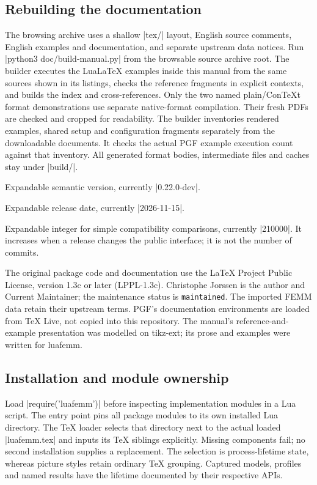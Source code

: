 \subsection{Rebuilding the documentation}
The browsing archive uses a shallow |tex/| layout, English source comments,
English examples and documentation, and separate upstream data notices.
Run |python3 doc/build-manual.py| from the browsable source
archive root. The builder executes the LuaLaTeX examples inside this manual
from the same sources shown in its listings, checks the reference fragments
in explicit contexts, and builds the index and cross-references. Only the
two named plain/ConTeXt format demonstrations use separate native-format
compilation. Their fresh PDFs are checked and cropped for readability.
The builder inventories rendered examples, shared setup and configuration
fragments separately from the downloadable documents. It checks the actual
PGF example execution count against that inventory. All generated format
bodies, intermediate files and caches stay under |build/|.

\begin{command}{\luafemmversion}
Expandable semantic version, currently |0.22.0-dev|.
\end{command}
\begin{command}{\luafemmversiondate}
Expandable release date, currently |2026-11-15|.
\end{command}
\begin{command}{\luafemmversionnumber}
Expandable integer for simple compatibility comparisons, currently |210000|.
It increases when a release changes the public interface; it is not the
number of commits.
\end{command}

The original package code and documentation use the LaTeX Project Public
License, version 1.3c or later (LPPL-1.3c). Christophe Jorssen is the author and
Current Maintainer; the maintenance status is \texttt{maintained}. The
imported FEMM data retain their upstream terms. PGF's documentation
environments are loaded from TeX Live, not copied into this repository.
The manual's reference-and-example presentation was modelled on tikz-ext;
its prose and examples were written for luafemm.

\subsection{Installation and module ownership}
Load |require('luafemm')| before inspecting implementation modules in a Lua
script. The entry point pins all package modules to its own installed Lua
directory. The TeX loader selects that directory next to the actual loaded
|luafemm.tex| and inputs its TeX siblings explicitly. Missing components fail;
no second installation supplies a replacement. The selection is process-lifetime
state, whereas picture styles retain ordinary TeX grouping. Captured models,
profiles and named results have the lifetime documented by their respective APIs.
